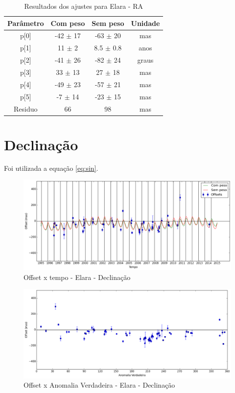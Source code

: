 \documentclass[11pt,a4paper]{report}
\begin{document}
\begin{table}[h!]
\caption{\label{Tab: Elara-RA} Resultados dos ajustes para Elara - RA}
\begin{centering}
\begin{tabular}{cccc}
\hline
\hline
Parâmetro & Com peso & Sem peso & Unidade\tabularnewline
\hline
p[0] & -42 $\pm$ 17 & -63 $\pm$ 20 & mas\\
p[1] & 11 $\pm$ 2 & 8.5 $\pm$ 0.8 & anos\\
p[2] & -41 $\pm$ 26 & -82 $\pm$ 24 & graus\\
p[3] & 33 $\pm$ 13 & 27 $\pm$ 18 & mas\\
p[4] & -49 $\pm$ 23 & -57 $\pm$ 21 & mas\\
p[5] & -7 $\pm$ 14 & -23 $\pm$ 15 & mas\\
Residuo & 66 & 98 & mas\\
\hline 
\end{tabular} 
\par\end{centering}
\end{table}

\section*{Declinação}

Foi utilizada a equação \ref{eq:sin}.

\begin{figure}[h]
\caption{Offset x tempo - Elara - Declinação}
\includegraphics[scale=0.45]{Elara/DEC.png} 
\end{figure}

\begin{figure}[h]
\caption{Offset x Anomalia Verdadeira - Elara - Declinação}
\includegraphics[scale=0.45]{Elara/DEC_anom.png}  
\end{figure}
\end{document}
